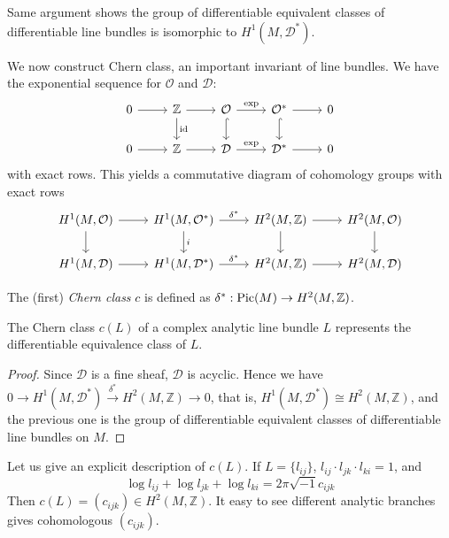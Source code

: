 \begin{rem}
    Same argument shows the group of differentiable equivalent classes of differentiable line bundles is isomorphic to $H^1(M,\mathcal{D}^*)$.
\end{rem}

We now construct Chern class, an important invariant of line bundles.
We have the exponential sequence for $\mathcal{O}$ and $\mathcal{D}$:
\[\begin{tikzcd}
    0 \ar[r] & \mathbb{Z} \ar[d, "\mathrm{id}"] \ar[r] & \mathcal{O} \ar[d, hook] \ar[r, "\exp"] & \mathcal{O}^* \ar[d, hook] \ar[r] & 0\\
    0 \ar[r] & \mathbb{Z} \ar[r] & \mathcal{D} \ar[r, "\exp"] & \mathcal{D}^* \ar[r] & 0
\end{tikzcd}\]
with exact rows.
This yields a commutative diagram of cohomology groups with exact rows
\[\begin{tikzcd}
    H^1(M,\mathcal{O}) \ar[r] \ar[d] & H^1(M,\mathcal{O}^*) \ar[r, "\delta^*"] \ar[d, "i"] & H^2(M,\mathbb{Z}) \ar[r] \ar[d] & H^2(M,\mathcal{O}) \ar[d]\\
    H^1(M,\mathcal{D}) \ar[r] & H^1(M,\mathcal{D}^*) \ar[r, "\delta^*"] & H^2(M,\mathbb{Z}) \ar[r] & H^2(M,\mathcal{D})
\end{tikzcd}\]

\begin{defn}
    The (first) \emph{Chern class} $c$ is defined as $\delta^*:\operatorname{Pic}(M)\to H^2(M,\mathbb{Z})$.
\end{defn}

\begin{prop}
    The Chern class $c(L)$ of a complex analytic line bundle $L$ represents the differentiable equivalence class of $L$.
\end{prop}
\begin{proof}
    Since $\mathcal{D}$ is a fine sheaf, $\mathcal{D}$ is acyclic.
    Hence we have $0\to H^1(M,\mathcal{D}^*)\xrightarrow{\delta^*} H^2(M,\mathbb{Z})\to 0$, that is, $H^1(M,\mathcal{D}^*)\cong H^2(M,\mathbb{Z})$, and the previous one is the group of differentiable equivalent classes of differentiable line bundles on $M$.
\end{proof}

Let us give an explicit description of $c(L)$.
If $L=\{l_{ij}\}$, $l_{ij}\cdot l_{jk}\cdot l_{ki}=1$, and
\[\log{l_{ij}}+\log{l_{jk}}+\log{l_{ki}}=2\pi\sqrt{-1}c_{ijk}\]
Then $c(L)=(c_{ijk})\in H^2(M,\mathbb{Z})$.
It easy to see different analytic branches gives cohomologous $(c_{ijk})$.


